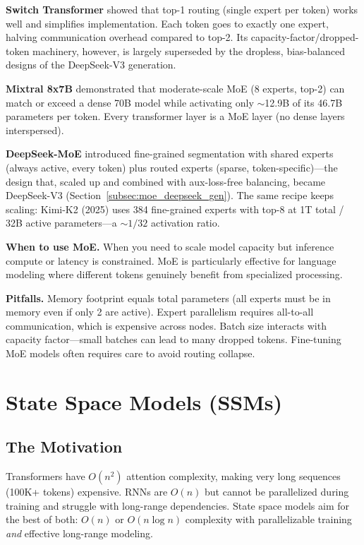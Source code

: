 \textbf{Switch Transformer} showed that top-1 routing (single expert per token) works well and simplifies implementation. Each token goes to exactly one expert, halving communication overhead compared to top-2. Its capacity-factor/dropped-token machinery, however, is largely superseded by the dropless, bias-balanced designs of the DeepSeek-V3 generation.

\textbf{Mixtral 8x7B} demonstrated that moderate-scale MoE (8 experts, top-2) can match or exceed a dense 70B model while activating only $\sim$12.9B of its 46.7B parameters per token. Every transformer layer is a MoE layer (no dense layers interspersed).

\textbf{DeepSeek-MoE} introduced fine-grained segmentation with shared experts (always active, every token) plus routed experts (sparse, token-specific)---the design that, scaled up and combined with aux-loss-free balancing, became DeepSeek-V3 (Section~\ref{subsec:moe_deepseek_gen}). The same recipe keeps scaling: Kimi-K2 (2025) uses 384 fine-grained experts with top-8 at 1T total / 32B active parameters---a $\sim 1/32$ activation ratio.

\textbf{When to use MoE.} When you need to scale model capacity but inference compute or latency is constrained. MoE is particularly effective for language modeling where different tokens genuinely benefit from specialized processing.

\textbf{Pitfalls.} Memory footprint equals total parameters (all experts must be in memory even if only 2 are active). Expert parallelism requires all-to-all communication, which is expensive across nodes. Batch size interacts with capacity factor---small batches can lead to many dropped tokens. Fine-tuning MoE models often requires care to avoid routing collapse.

\section{State Space Models (SSMs)}
\label{sec:ssms}

\subsection{The Motivation}

Transformers have $O(n^2)$ attention complexity, making very long sequences (100K+ tokens) expensive. RNNs are $O(n)$ but cannot be parallelized during training and struggle with long-range dependencies. State space models aim for the best of both: $O(n)$ or $O(n \log n)$ complexity with parallelizable training \textit{and} effective long-range modeling.

